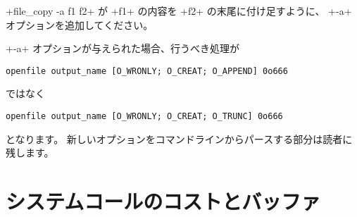 \begin{exercise}
\ml+file_copy -a f1 f2+ が \ml+f1+ の内容を \ml+f2+ の末尾に付け足すように、
\ml+-a+ オプションを追加してください。
\end{exercise}
\begin{answer}
\ml+-a+ オプションが与えられた場合、行うべき処理が
%
\begin{lstlisting}
openfile output_name [O_WRONLY; O_CREAT; O_APPEND] 0o666
\end{lstlisting}
%
ではなく
%
\begin{lstlisting}
openfile output_name [O_WRONLY; O_CREAT; O_TRUNC] 0o666
\end{lstlisting}
%
となります。 新しいオプションをコマンドラインからパースする部分は読者に残します。
\end{answer}

\section{システムコールのコストとバッファ}

